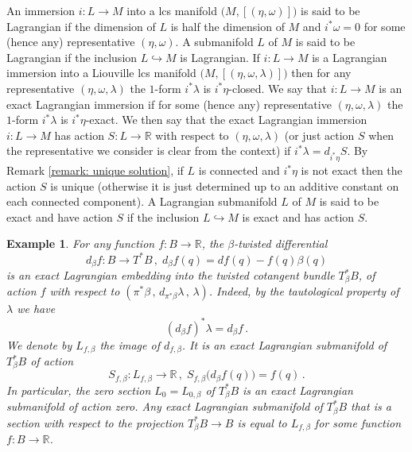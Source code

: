 \documentclass{amsart}
\newtheorem{example}[thm]{Example}
\theoremstyle{remark}
\begin{document}
An immersion $i: L \rightarrow M$
into a lcs manifold $\big(M, [(\eta, \omega)] \big)$
is said to be Lagrangian
if the dimension of $L$ is half the dimension of $M$
and $i^{\ast} \omega = 0$
for some (hence any) representative $(\eta, \omega)$.
A submanifold $L$ of $M$ is said to be Lagrangian
if the inclusion $L \hookrightarrow M$ is Lagrangian.
If $i: L \rightarrow M$ is a Lagrangian immersion
into a Liouville lcs manifold $\big(M, [(\eta, \omega, \lambda)] \big)$
then for any representative $(\eta, \omega, \lambda)$
the $1$-form $i^{\ast}\lambda$ is $i^{\ast}\eta$-closed.
We say that $i: L \rightarrow M$ is an exact Lagrangian immersion
if for some (hence any) representative $(\eta, \omega, \lambda)$
the $1$-form $i^{\ast}\lambda$ is $i^{\ast}\eta$-exact.
We then say that the exact Lagrangian immersion $i: L \rightarrow M$
has action $S: L \rightarrow \mathbb{R}$ with respect to $(\eta, \omega, \lambda)$
(or just action $S$ when the representative we consider
is clear from the context)
if $i^{\ast}\lambda = d_{i^{\ast}\eta} S$.
By Remark \ref{remark: unique solution},
if $L$ is connected and $i^{\ast} \eta$ is not exact
then the action $S$ is unique
(otherwise it is just determined up to an additive constant
on each connected component).
A Lagrangian submanifold $L$ of $M$ is said to be exact
and have action $S$
if the inclusion $L \hookrightarrow M$ is exact
and has action $S$.

\begin{example}\label{example: Lagrangians in twisted cotangent bundle}
For any function $f: B \rightarrow \mathbb{R}$,
the $\beta$-twisted differential
\[
d_{\beta}f: B \rightarrow T^{\ast}B \,,\;
d_{\beta}f(q)
= df(q) - f(q) \beta(q)
\]
is an exact Lagrangian embedding
into the twisted cotangent bundle $T_{\beta}^{\ast}B$,
of action $f$ with respect to
$(\pi^{\ast}\beta \,,\, d_{\pi^{\ast}\beta} \lambda \,,\, \lambda )$.
Indeed,
by the tautological property of $\lambda$
we have
\[
(d_{\beta} f)^{\ast} \lambda = d_{\beta} f \,.
\]
We denote by $L_{f, \beta}$ the image of $d_{f, \beta}$.
It is an exact Lagrangian submanifold of $T^{\ast}_{\beta}B$
of action
\[
S_{f, \beta}: L_{f, \beta} \rightarrow \mathbb{R} \,,\;
S_{f, \beta} \big(d_{\beta}f(q)\big) = f(q) \,.
\]
In particular,
the zero section $L_0 = L_{0, \beta}$ of $T_{\beta}^{\ast}B$
is an exact Lagrangian submanifold of action zero.
Any exact Lagrangian submanifold of $T^{\ast}_{\beta}B$
that is a section with respect to the projection
$T^{\ast}_{\beta}B \rightarrow B$
is equal to $L_{f, \beta}$
for some function $f: B \rightarrow \mathbb{R}$.
\end{example}
\end{document}
